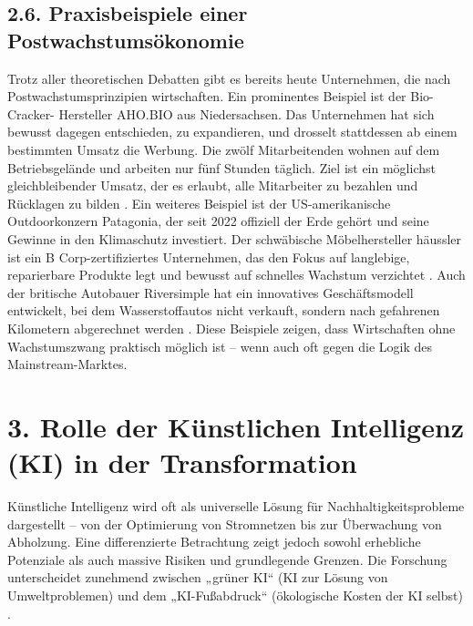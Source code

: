 \documentclass[12pt, a4paper]{article}
\begin{document}
	\subsection*{2.6. Praxisbeispiele einer Postwachstumsökonomie}
	Trotz aller theoretischen Debatten gibt es bereits heute Unternehmen, die nach
	Postwachstumsprinzipien wirtschaften.
	Ein prominentes Beispiel ist der Bio-Cracker-
	Hersteller AHO.BIO aus Niedersachsen. Das Unternehmen hat sich bewusst dagegen
	entschieden, zu expandieren, und drosselt stattdessen ab einem bestimmten Umsatz die
	Werbung.
	Die zwölf Mitarbeitenden wohnen auf dem Betriebsgelände und arbeiten nur
	fünf Stunden täglich.
	Ziel ist ein möglichst gleichbleibender Umsatz, der es erlaubt,
	alle Mitarbeiter zu bezahlen und Rücklagen zu bilden \cite{goethe2026}.
	Ein weiteres
	Beispiel ist der US-amerikanische Outdoorkonzern Patagonia, der seit 2022 offiziell
	der Erde gehört und seine Gewinne in den Klimaschutz investiert.
	Der schwäbische
	Möbelhersteller häussler ist ein B Corp-zertifiziertes Unternehmen, das den Fokus
	auf langlebige, reparierbare Produkte legt und bewusst auf schnelles Wachstum
	verzichtet \cite{goethe2026}.
	Auch der britische Autobauer Riversimple hat ein
	innovatives Geschäftsmodell entwickelt, bei dem Wasserstoffautos nicht verkauft,
	sondern nach gefahrenen Kilometern abgerechnet werden \cite{sciencedirect2016}.
	Diese
	Beispiele zeigen, dass Wirtschaften ohne Wachstumszwang praktisch möglich ist – wenn
	auch oft gegen die Logik des Mainstream-Marktes.
	
	\section*{3. Rolle der Künstlichen Intelligenz (KI) in der Transformation}
	
	Künstliche Intelligenz wird oft als universelle Lösung für Nachhaltigkeitsprobleme
	dargestellt – von der Optimierung von Stromnetzen bis zur Überwachung von
	Abholzung.
	Eine differenzierte Betrachtung zeigt jedoch sowohl erhebliche Potenziale
	als auch massive Risiken und grundlegende Grenzen.
	Die Forschung unterscheidet
	zunehmend zwischen „grüner KI“ (KI zur Lösung von Umweltproblemen) und dem „KI-Fußabdruck“
	(ökologische Kosten der KI selbst) \cite{vinuesa2020}.
	
\end{document}
